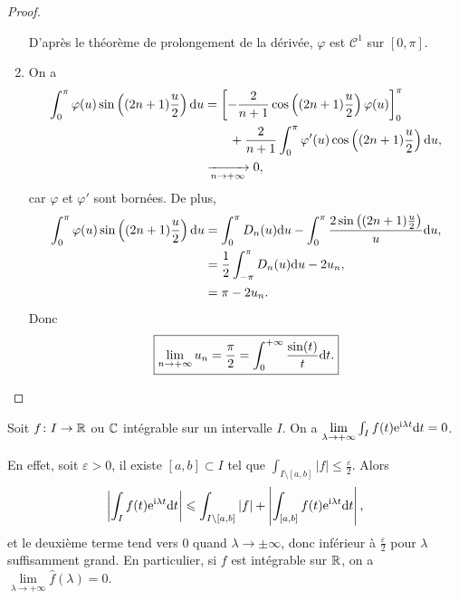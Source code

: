\documentclass[12pt]{article}
\begin{document}
\begin{proof}
\begin{enumerate}
        D'après le théorème de prolongement de la dérivée, $\varphi$ est $\mathcal{C}^{1}$ sur $[0,\pi]$.

        \item On a 
        \begin{align}
            \int_{0}^{\pi}\varphi(u)\sin\left((2n+1)\frac{u}{2}\right)\mathrm{d} u
            &=\left[-\frac{2}{n+1}\cos\left((2n+1)\frac{u}{2}\right)\varphi(u)\right]_{0}^{\pi}\nonumber\\
            &\qquad+\frac{2}{n+1}\int_{0}^{\pi}\varphi'(u)\cos\left((2n+1)\frac{u}{2}\right)\mathrm{d} u,\\
            &\xrightarrow[n\to+\infty]{}0,
        \end{align}
        car $\varphi$ et $\varphi'$ sont bornées. De plus,
        \begin{align}
            \int_{0}^{\pi}\varphi(u)\sin\left((2n+1)\frac{u}{2}\right)\mathrm{d} u
            &=\int_{0}^{\pi}D_n(u)\mathrm{d} u-\int_{0}^{\pi}\frac{2\sin\left((2n+1)\frac{u}{2}\right)}{u}\mathrm{d} u,\\
            &=\frac{1}{2}\int_{-\pi}^{\pi}D_n(u)\mathrm{d} u-2u_n,\\
            &=\pi-2u_n.
        \end{align}
        Donc
        \begin{equation}
            \boxed{
                \lim\limits_{n\to+\infty}u_n=\frac{\pi}{2}=\int_{0}^{+\infty}\frac{\sin(t)}{t}\mathrm{d} t.
            }
        \end{equation}
    \end{enumerate}
\end{proof}

\begin{remark}
    Soit $f\colon I\to\mathbb{R}$ ou $\mathbb{C}$ intégrable sur un intervalle $I$. On a $\lim\limits_{\lambda\to+\infty}\int_{I}f(t)\mathrm{e}^{\mathrm{i}\lambda t}\mathrm{d} t=0$.

    En effet, soit $\varepsilon>0$, il existe $[a,b]\subset I$ tel que $\int_{I\setminus[a,b]}\left\lvert f\right\rvert\leqslant\frac{\varepsilon}{2}$. Alors 
    \begin{equation}
        \left\lvert\int_{I}f(t)\mathrm{e}^{\mathrm{i}\lambda t}\mathrm{d} t\right\rvert\leqslant\int_{I\setminus[a,b]}\left\lvert f\right\rvert+\left\lvert\int_{[a,b]}f(t)\mathrm{e}^{\mathrm{i}\lambda t}\mathrm{d} t\right\rvert,
    \end{equation}
    et le deuxième terme tend vers 0 quand $\lambda\to \pm\infty$, donc inférieur à $\frac{\varepsilon}{2}$ pour $\lambda$ suffisamment grand. En particulier, si $f$ est intégrable sur $\mathbb{R}$, on a $\lim\limits_{\lambda\to+\infty}\widehat{f}(\lambda)=0$.
\end{remark}
\end{document}
